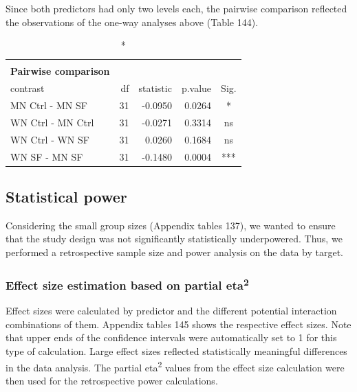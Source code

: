 \documentclass[
  12pt,
  letterpaper,
]{article}
\begin{document}
Since both predictors had only two levels each, the pairwise comparison reflected the observations of the one-way analyses above (Table 144).

\begingroup
\fontsize{12.0pt}{14.4pt}\selectfont
\begin{longtable}{l|rrrc}
\caption*{
{\large \textbf{Appendix Table 144}} \\ 
{\small \textbf{Pairwise comparison}}
} \\ 
\toprule
contrast & {df} & {statistic} & {p.value} & {Sig.} \\ 
\midrule\addlinespace[2.5pt]
MN Ctrl - MN SF & 31 & -0.0950 & 0.0264 & * \\ 
WN Ctrl - MN Ctrl & 31 & -0.0271 & 0.3314 & ns \\ 
WN Ctrl - WN SF & 31 & 0.0260 & 0.1684 & ns \\ 
WN SF - MN SF & 31 & -0.1480 & 0.0004 & *** \\ 
\bottomrule
\end{longtable}
\endgroup

\subsection{Statistical power}\label{statistical-power-3}

Considering the small group sizes (Appendix tables 137), we wanted to ensure that the study design was not significantly statistically underpowered. Thus, we performed a retrospective sample size and power analysis on the data by target.

\subsubsection{\texorpdfstring{Effect size estimation based on partial eta\textsuperscript{2}}{Effect size estimation based on partial eta2}}\label{effect-size-estimation-based-on-partial-eta2-3}

Effect sizes were calculated by predictor and the different potential interaction combinations of them. Appendix tables 145 shows the respective effect sizes. Note that upper ends of the confidence intervals were automatically set to 1 for this type of calculation. Large effect sizes reflected statistically meaningful differences in the data analysis. The partial eta\textsuperscript{2} values from the effect size calculation were then used for the retrospective power calculations.
\end{document}
